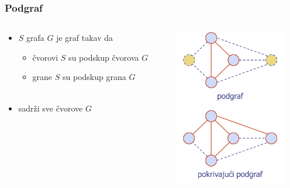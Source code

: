 \documentclass[compress]{beamer}
\begin{document}
\begin{frame}[fragile]
  \frametitle{Podgraf}
  \begin{columns}
    \begin{column}[t]{6cm}
      \begin{itemize}
        \item {} $S$ grafa $G$ je graf takav da
        \begin{itemize}
          \item čvorovi $S$ su podskup čvorova $G$
          \item grane $S$ su podskup grana $G$ \\ \ \\
        \end{itemize}
        \item {} sadrži sve čvorove $G$
      \end{itemize}
    \end{column}
    \begin{column}[t]{6cm}
      \begin{center}
        \includegraphics[width=5cm]{asp-14-pic14.png}
      \end{center}
    \end{column}
  \end{columns}
\end{frame}
\end{document}
